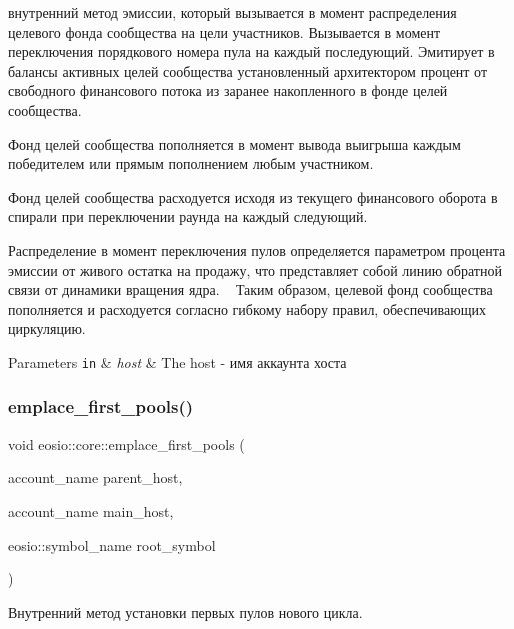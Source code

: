 внутренний метод эмиссии, который вызывается в момент распределения целевого фонда сообщества на цели участников. Вызывается в момент переключения порядкового номера пула на каждый последующий. Эмитирует в балансы активных целей сообщества установленный архитектором процент от свободного финансового потока из заранее накопленного в фонде целей сообщества. 

Фонд целей сообщества пополняется в момент вывода выигрыша каждым победителем или прямым пополнением любым участником.

Фонд целей сообщества расходуется исходя из текущего финансового оборота в спирали при переключении раунда на каждый следующий.

Распределение в момент переключения пулов определяется параметром процента эмиссии от живого остатка на продажу, что представляет собой линию обратной связи от динамики вращения ядра. ~\newline
 Таким образом, целевой фонд сообщества пополняется и расходуется согласно гибкому набору правил, обеспечивающих циркуляцию.


\begin{DoxyParams}[1]{Parameters}
\mbox{\tt in}  & {\em host} & The host -\/ имя аккаунта хоста \\
\hline
\end{DoxyParams}
\mbox{\label{structeosio_1_1core_a1c8358af15c27c968b4879661242ee7a}} 
\subsubsection{\texorpdfstring{emplace\+\_\+first\+\_\+pools()}{emplace\_first\_pools()}}
{\footnotesize\ttfamily void eosio\+::core\+::emplace\+\_\+first\+\_\+pools (\begin{DoxyParamCaption}\item[{account\+\_\+name}]{parent\+\_\+host,  }\item[{account\+\_\+name}]{main\+\_\+host,  }\item[{eosio\+::symbol\+\_\+name}]{root\+\_\+symbol }\end{DoxyParamCaption})\hspace{0.3cm}{\ttfamily [inline]}}



Внутренний метод установки первых пулов нового цикла. 


